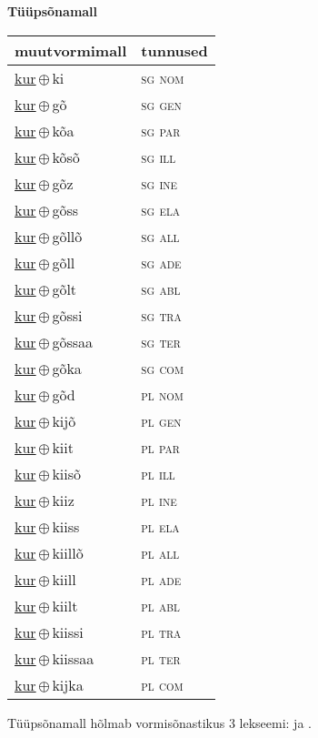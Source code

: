

\vspace{3.5em}
\noindent \begin{minipage}{\textwidth}
\noindent \textbf{Tüüpsõnamall \,}\\

\begin{sideways}
\begin{tabular}{l l}
muutvormimall & tunnused \\
\hline
\underline{kur}\,$\oplus$\,ki & \textsc{ sg nom } \\
\underline{kur}\,$\oplus$\,gõ & \textsc{ sg gen } \\
\underline{kur}\,$\oplus$\,kõa & \textsc{ sg par } \\
\underline{kur}\,$\oplus$\,kõsõ & \textsc{ sg ill } \\
\underline{kur}\,$\oplus$\,gõz & \textsc{ sg ine } \\
\underline{kur}\,$\oplus$\,gõss & \textsc{ sg ela } \\
\underline{kur}\,$\oplus$\,gõllõ & \textsc{ sg all } \\
\underline{kur}\,$\oplus$\,gõll & \textsc{ sg ade } \\
\underline{kur}\,$\oplus$\,gõlt & \textsc{ sg abl } \\
\underline{kur}\,$\oplus$\,gõssi & \textsc{ sg tra } \\
\underline{kur}\,$\oplus$\,gõssaa & \textsc{ sg ter } \\
\underline{kur}\,$\oplus$\,gõka & \textsc{ sg com } \\
\underline{kur}\,$\oplus$\,gõd & \textsc{ pl nom } \\
\underline{kur}\,$\oplus$\,kijõ & \textsc{ pl gen } \\
\underline{kur}\,$\oplus$\,kiit & \textsc{ pl par } \\
\underline{kur}\,$\oplus$\,kiisõ & \textsc{ pl ill } \\
\underline{kur}\,$\oplus$\,kiiz & \textsc{ pl ine } \\
\underline{kur}\,$\oplus$\,kiiss & \textsc{ pl ela } \\
\underline{kur}\,$\oplus$\,kiillõ & \textsc{ pl all } \\
\underline{kur}\,$\oplus$\,kiill & \textsc{ pl ade } \\
\underline{kur}\,$\oplus$\,kiilt & \textsc{ pl abl } \\
\underline{kur}\,$\oplus$\,kiissi & \textsc{ pl tra } \\
\underline{kur}\,$\oplus$\,kiissaa & \textsc{ pl ter } \\
\underline{kur}\,$\oplus$\,kijka & \textsc{ pl com } \\
\end{tabular}
\end{sideways}
\label{tab:tüüpsõnamall-kurki}

\end{minipage}

 
\vspace{1em}
\noindent Tüüpsõnamall  hõlmab vormisõnastikus 3 lekseemi:  ja .

